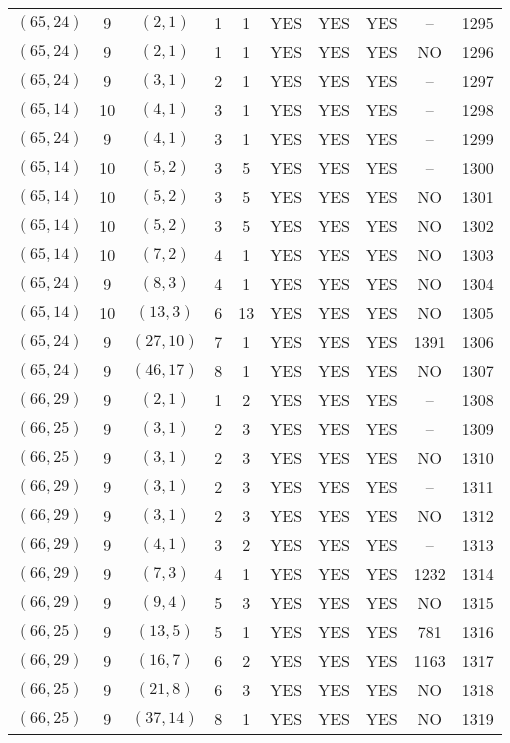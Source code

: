 \begin{longtable}{|c|c|c|c|c|c|c|c|c|c|}
$(65, 24)$ & 9 & $(2, 1)$ & 1 & 1 & YES & YES & YES & -- & 1295\\
$(65, 24)$ & 9 & $(2, 1)$ & 1 & 1 & YES & YES & YES & NO & 1296\\
$(65, 24)$ & 9 & $(3, 1)$ & 2 & 1 & YES & YES & YES & -- & 1297\\
$(65, 14)$ & 10 & $(4, 1)$ & 3 & 1 & YES & YES & YES & -- & 1298\\
$(65, 24)$ & 9 & $(4, 1)$ & 3 & 1 & YES & YES & YES & -- & 1299\\
$(65, 14)$ & 10 & $(5, 2)$ & 3 & 5 & YES & YES & YES & -- & 1300\\
$(65, 14)$ & 10 & $(5, 2)$ & 3 & 5 & YES & YES & YES & NO & 1301\\
$(65, 14)$ & 10 & $(5, 2)$ & 3 & 5 & YES & YES & YES & NO & 1302\\
$(65, 14)$ & 10 & $(7, 2)$ & 4 & 1 & YES & YES & YES & NO & 1303\\
$(65, 24)$ & 9 & $(8, 3)$ & 4 & 1 & YES & YES & YES & NO & 1304\\
$(65, 14)$ & 10 & $(13, 3)$ & 6 & 13 & YES & YES & YES & NO & 1305\\
$(65, 24)$ & 9 & $(27, 10)$ & 7 & 1 & YES & YES & YES & 1391 & 1306\\
$(65, 24)$ & 9 & $(46, 17)$ & 8 & 1 & YES & YES & YES & NO & 1307\\
$(66, 29)$ & 9 & $(2, 1)$ & 1 & 2 & YES & YES & YES & -- & 1308\\
$(66, 25)$ & 9 & $(3, 1)$ & 2 & 3 & YES & YES & YES & -- & 1309\\
$(66, 25)$ & 9 & $(3, 1)$ & 2 & 3 & YES & YES & YES & NO & 1310\\
$(66, 29)$ & 9 & $(3, 1)$ & 2 & 3 & YES & YES & YES & -- & 1311\\
$(66, 29)$ & 9 & $(3, 1)$ & 2 & 3 & YES & YES & YES & NO & 1312\\
$(66, 29)$ & 9 & $(4, 1)$ & 3 & 2 & YES & YES & YES & -- & 1313\\
$(66, 29)$ & 9 & $(7, 3)$ & 4 & 1 & YES & YES & YES & 1232 & 1314\\
$(66, 29)$ & 9 & $(9, 4)$ & 5 & 3 & YES & YES & YES & NO & 1315\\
$(66, 25)$ & 9 & $(13, 5)$ & 5 & 1 & YES & YES & YES & 781 & 1316\\
$(66, 29)$ & 9 & $(16, 7)$ & 6 & 2 & YES & YES & YES & 1163 & 1317\\
$(66, 25)$ & 9 & $(21, 8)$ & 6 & 3 & YES & YES & YES & NO & 1318\\
$(66, 25)$ & 9 & $(37, 14)$ & 8 & 1 & YES & YES & YES & NO & 1319\\

\end{longtable}
